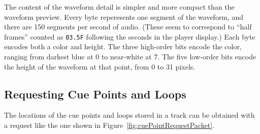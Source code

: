 \documentclass[11pt]{article}
\begin{document}
The content of the waveform detail is simpler and more compact than
the waveform preview. Every byte reperesents one segment of the
waveform, and there are 150 segments per second of audio. (These seem
to correspond to ``half frames'' counted as {\tt 03.5{\tiny F}} following the
seconds in the player display.) Each byte encodes both a color and
height. The three high-order bits encode the color, ranging from
darkest blue at 0 to near-white at 7. The five low-order bits encode
the height of the waveform at that point, from 0 to 31 pixels.

\subsection{Requesting Cue Points and Loops}

The locations of the cue points and loops stored in a track can be
obtained with a request like the one shown in
Figure~\ref{fig:cuePointRequestPacket}.
\end{document}
